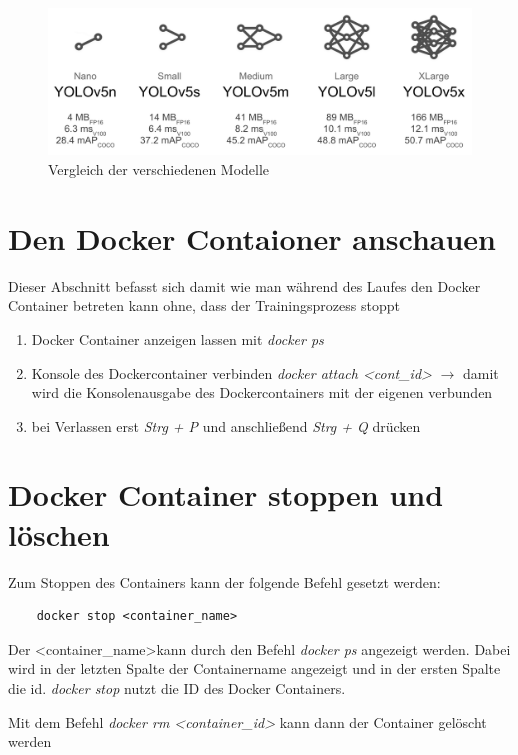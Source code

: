 \begin{figure}
    \centering
    \includegraphics[width=12cm]{data/img/model_comparison.png}
    \caption{Vergleich der verschiedenen Modelle}
    \label{fig:yolo_mod_compar}
\end{figure}
\section{Den Docker Contaioner anschauen}
Dieser Abschnitt befasst sich damit wie man während des Laufes den Docker Container betreten kann ohne, dass der Trainingsprozess stoppt
\begin{enumerate}
    \item Docker Container anzeigen lassen mit \textit{docker ps}
    \item Konsole des Dockercontainer verbinden \textit{docker attach \textless cont\_id\textgreater} $\rightarrow$ damit wird die Konsolenausgabe des Dockercontainers mit der eigenen verbunden
    \item bei Verlassen erst \textit{Strg + P} und anschließend \textit{Strg + Q} drücken 
\end{enumerate}

\section{Docker Container stoppen und löschen}
Zum Stoppen des Containers kann der folgende Befehl gesetzt werden:
\begin{verbatim}
    docker stop <container_name>
\end{verbatim}
Der \textless container\_name\textgreater kann durch den Befehl \textit{docker ps} angezeigt werden. Dabei wird in der letzten Spalte der Containername angezeigt und in der ersten Spalte die id. \textit{docker stop} nutzt die ID des Docker Containers.

Mit dem Befehl \textit{docker rm \textless container\_id\textgreater} kann dann der Container gelöscht werden 